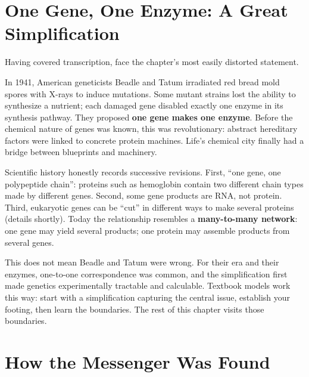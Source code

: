 \section{One Gene, One Enzyme: A Great Simplification}

Having covered transcription, face the chapter's most easily distorted statement.

In 1941, American geneticists Beadle and Tatum irradiated red bread mold spores with X-rays to induce mutations. Some mutant strains lost the ability to synthesize a nutrient; each damaged gene disabled exactly one enzyme in its synthesis pathway. They proposed \textbf{one gene makes one enzyme}. Before the chemical nature of genes was known, this was revolutionary: abstract hereditary factors were linked to concrete protein machines. Life's chemical city finally had a bridge between blueprints and machinery.

Scientific history honestly records successive revisions. First, ``one gene, one polypeptide chain'': proteins such as hemoglobin contain two different chain types made by different genes. Second, some gene products are RNA, not protein. Third, eukaryotic genes can be ``cut'' in different ways to make several proteins (details shortly). Today the relationship resembles a \textbf{many-to-many network}: one gene may yield several products; one protein may assemble products from several genes.

This does not mean Beadle and Tatum were wrong. For their era and their enzymes, one-to-one correspondence was common, and the simplification first made genetics experimentally tractable and calculable. Textbook models work this way: start with a simplification capturing the central issue, establish your footing, then learn the boundaries. The rest of this chapter visits those boundaries.

\section{How the Messenger Was Found}

